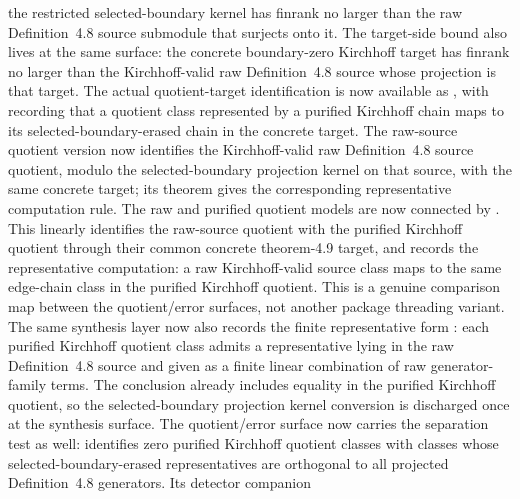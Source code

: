 \documentclass[11pt]{article}
\begin{document}
\begin{itemize}
the restricted selected-boundary kernel has finrank no larger than the raw
Definition~4.8 source submodule that surjects onto it.
The target-side bound
 also lives at
the same surface: the concrete boundary-zero Kirchhoff target has finrank no
larger than the Kirchhoff-valid raw Definition~4.8 source whose projection is
that target.
The actual quotient-target identification is now available as
,
with
recording that a quotient class represented by a purified Kirchhoff chain maps
to its selected-boundary-erased chain in the concrete target.
The raw-source quotient version
 now
identifies the Kirchhoff-valid raw Definition~4.8 source quotient, modulo the
selected-boundary projection kernel on that source, with the same concrete
target; its  theorem gives the
corresponding representative computation rule.
The raw and purified quotient models are now connected by
.
This linearly identifies the raw-source quotient with the purified Kirchhoff
quotient through their common concrete theorem-4.9 target, and
records the representative computation: a raw Kirchhoff-valid source class maps
to the same edge-chain class in the purified Kirchhoff quotient.  This is a
genuine comparison map between the quotient/error surfaces, not another package
threading variant.
The same synthesis layer now also records the finite representative form
:
each purified Kirchhoff quotient class admits a representative lying in the raw
Definition~4.8 source and given as a finite linear combination of raw
generator-family terms.  The conclusion already includes equality in the
purified Kirchhoff quotient, so the selected-boundary projection kernel
conversion is discharged once at the synthesis surface.
The quotient/error surface now carries the separation test as well:
identifies zero purified Kirchhoff quotient classes with classes whose
selected-boundary-erased representatives are orthogonal to all projected
Definition~4.8 generators.  Its detector companion

\end{itemize}
\end{document}
